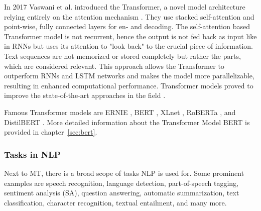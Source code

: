 In 2017 Vaswani et al. introduced the Transformer, a novel model architecture relying entirely on the attention mechanism \cite{vaswani2017attention}. They use stacked self-attention and point-wise, fully connected layers for en- and decoding. 
The self-attention based Transformer model is not recurrent, hence the output is not fed back as input like in RNNs but uses its attention to "look back" to the crucial piece of information. Text sequences are not memorized or stored completely but rather the parts, which are considered relevant. This approach allows the Transformer to outperform RNNs and LSTM networks and makes the model more parallelizable, resulting in enhanced computational performance. Transformer models proved to improve the state-of-the-art approaches in the field \cite{vaswani2017attention}. 

Famous Transformer models are ERNIE \cite{zhang2019ernie}, BERT \cite{jin2019bert}, XLnet \cite{yang2019xlnet}, RoBERTa \cite{liu2019roberta}, and DistilBERT \cite{sanh2019distilbert}. More detailed information about the Transformer Model BERT is provided in chapter~\ref{sec:bert}.

\subsubsection{Tasks in NLP}
    \label{sec:tasks_in_nLP}

Next to MT, there is a broad scope of tasks NLP is used for. Some prominent examples are speech recognition, language detection, part-of-speech tagging, sentiment analysis (SA), question answering, automatic summarization, text classification, character recognition, textual entailment, and many more.


